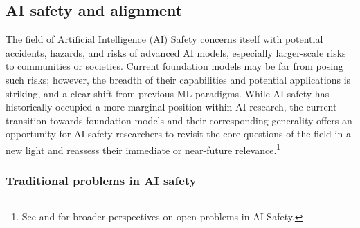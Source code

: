 \newsection
\subsection{AI safety and alignment}
\label{sec:ai-safety}

The field of Artificial Intelligence (AI) Safety concerns itself with potential accidents, hazards, and risks of advanced AI models, especially larger-scale risks to communities or societies. Current foundation models may be far from posing such risks; however, the breadth of their capabilities and potential applications is striking, and a clear shift from previous ML paradigms. 
While AI safety has historically occupied a more marginal position within AI research, the current transition towards foundation models and their corresponding generality offers an opportunity for AI safety researchers to revisit the core questions of the field in a new light and reassess their immediate or near-future relevance.\footnote{See \citet{amodei2016concrete} and \citet{hendryckssafety2021} for broader perspectives on open problems in AI Safety.}

\subsubsection{Traditional problems in AI safety}

